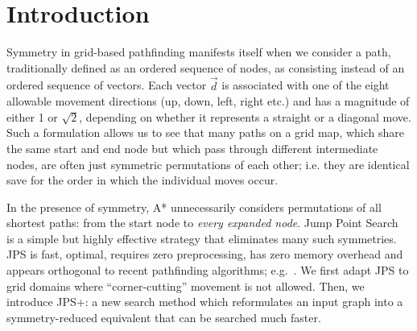 \section{Introduction}
\label{sec:introduction}

Symmetry in grid-based pathfinding manifests itself when we consider a
path, traditionally defined as an ordered sequence of nodes, as consisting
instead of an ordered sequence of vectors.
Each vector $\vec{d}$ is associated with 
one of the eight allowable movement directions (up, down, left, right etc.)
and has a magnitude of either 1 or $\sqrt 2$, depending on whether 
it represents a straight or a diagonal move.
Such a formulation allows us to see that 
many paths on a grid map, which share the same start and end node but which pass through 
different intermediate nodes, are often just symmetric permutations of each other; i.e.
they are identical save for the order in which the individual moves occur.

In the presence of symmetry, A* unnecessarily considers permutations 
of all shortest paths: from the start node to 
\emph{every expanded node}.
Jump Point Search~\cite{harabor11b} is a simple but highly effective strategy that
eliminates many such symmetries. 
JPS is fast, optimal, requires zero preprocessing, has zero memory overhead
and appears orthogonal to recent pathfinding algorithms; e.g.~\cite{bjornsson06,pochter09,goldenberg10}. 
We first adapt JPS to grid domains where ``corner-cutting'' movement is not allowed. 
Then, we introduce JPS+: a new search method which reformulates an input graph into a 
symmetry-reduced equivalent that can be 
searched much faster.
